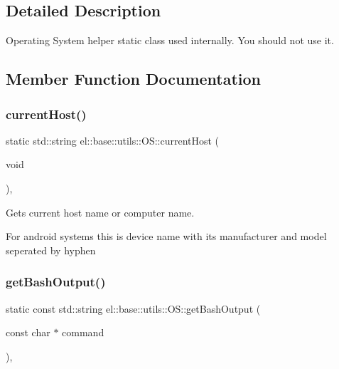 \subsection{Detailed Description}
Operating System helper static class used internally. You should not use it. 

\subsection{Member Function Documentation}
\mbox{\label{classel_1_1base_1_1utils_1_1_o_s_aae4fdf83828228fc440f8a875c5942b0}} 
\subsubsection{\texorpdfstring{current\+Host()}{currentHost()}}
{\footnotesize\ttfamily static std\+::string el\+::base\+::utils\+::\+O\+S\+::current\+Host (\begin{DoxyParamCaption}\item[{void}]{ }\end{DoxyParamCaption})\hspace{0.3cm}{\ttfamily [inline]}, {\ttfamily [static]}}



Gets current host name or computer name. 

For android systems this is device name with its manufacturer and model seperated by hyphen \mbox{\label{classel_1_1base_1_1utils_1_1_o_s_a91304c76c872459eaa9fdb3466367cd3}} 
\subsubsection{\texorpdfstring{get\+Bash\+Output()}{getBashOutput()}}
{\footnotesize\ttfamily static const std\+::string el\+::base\+::utils\+::\+O\+S\+::get\+Bash\+Output (\begin{DoxyParamCaption}\item[{const char $\ast$}]{command }\end{DoxyParamCaption})\hspace{0.3cm}{\ttfamily [inline]}, {\ttfamily [static]}}



